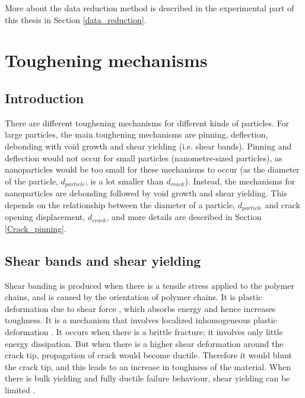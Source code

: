 \documentclass[numbers=noendperiod,chapterprefix=on]{icldt} %
\begin{document}
More about the data reduction method is described in the experimental part of this thesis in Section \ref{data_reduction}.

\section{Toughening mechanisms} \label{Toughening Mechanisms}
\subsection{Introduction}
There are different toughening mechanisms for different kinds of particles. For large particles, the main toughening mechanisms are pinning, deflection, debonding with void growth and shear yielding (i.e. shear bands). Pinning and deflection would not occur for small particles (nanometre-sized particles), as nanoparticles would be too small for these mechanisms to occur (as the diameter of the particle, $d_{particle}$, is a lot smaller than $d_{crack}$). Instead, the mechanisms for nanoparticles are debonding followed by void growth and shear yielding. This depends on the relationship between the diameter of a particle, $d_{particle}$ and crack opening displacement, $d_{crack}$, and more details are described in Section \ref{Crack_pinning}.

\subsection{Shear bands and shear yielding}
Shear banding is produced when there is a tensile stress applied to the polymer chains, and is caused by the orientation of polymer chains. It is plastic deformation due to shear force \cite{Mohammed2007}, which absorbs energy and hence increases toughness. It is a mechanism that involves localized inhomogeneous plastic deformation \cite{Kinloch1994}. It occurs when there is a brittle fracture; it involves only little energy dissipation. But when there is a higher shear deformation around the crack tip, propagation of crack would become ductile. Therefore it would blunt the crack tip, and this leads to an increase in toughness of the material. When there is bulk yielding and fully ductile failure behaviour, shear yielding can be limited \cite{Kinloch1994}. 
\end{document}
